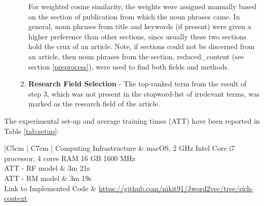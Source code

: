 \documentclass[runningheads]{llncs}
\begin{document}
\begin{itemize}
\begin{enumerate}
			For weighted cosine similarity, the weights were assigned manually based on the section of publication from which the noun phrases came. In general, noun phrases from title and keywords (if present) were given a higher preference than other sections, since usually these two sections hold the crux of an article. Note, if sections could not be discerned from an article, then noun phrases from the section, reduced\_content (see section \ref{preprocess}), were used to find both fields and methods.
			\smallskip
			\item \textbf{Research Field Selection} - The top-ranked term from the %
			result of step 3, which was not present in the stopword-list of irrelevant terms, was marked as the research field of the article.
			\smallskip
		\end{enumerate}
	\end{itemize}
	
	The experimental set-up and average training times (ATT) have been reported in Table \ref{tab:setup}:
	
	\begin{table}[!htb]
		\centering
		\captionsetup{justification=centering,margin=1.2cm}
		\caption{Experimental set-up for training the word2vec models for Research Field (RF) and Methods (RM) Identification}
		\label{tab:setup}
		\begin{tabular}{|C{5cm} | C{7cm} |} \hline
			Computing Infrastructure & macOS, 2 GHz Intel Core i7 processor, 4 cores \smallskip RAM 16 GB 1600 MHz  \\ \hline
			ATT - RF model & 3m 21s \\ \hline
			ATT - RM model & 3m 19s\\ \hline
			Link to Implemented Code & \url{https://github.com/nikit91/Jword2vec/tree/rich-context}\\ \hline
		\end{tabular}
	\end{table}
	
	
	
	
	
\end{document}
